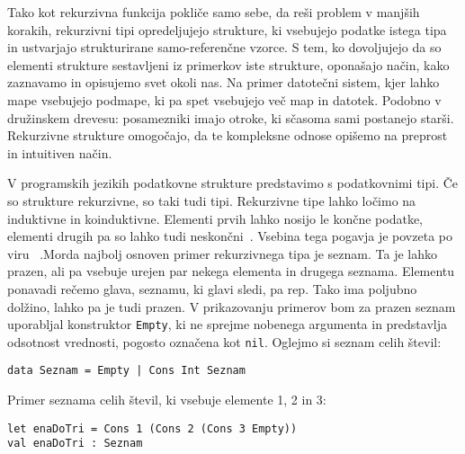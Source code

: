 \documentclass[12pt,a4paper,openany]{book}
\begin{document}
Tako kot rekurzivna funkcija pokliče samo sebe, da reši problem v manjših korakih, rekurzivni tipi opredeljujejo strukture, ki vsebujejo podatke istega tipa in ustvarjajo strukturirane 
samo-referenčne vzorce. S tem, ko dovoljujejo da so elementi strukture sestavljeni iz primerkov iste strukture, oponašajo način, kako zaznavamo in opisujemo svet okoli nas. 
Na primer datotečni sistem, kjer lahko mape vsebujejo podmape, ki pa spet vsebujejo več map in datotek. Podobno v družinskem drevesu: posamezniki imajo otroke, ki sčasoma sami 
postanejo starši. Rekurzivne strukture omogočajo, da te kompleksne odnose opišemo na preprost in intuitiven način.

V programskih jezikih podatkovne strukture predstavimo s podatkovnimi tipi. Če so strukture rekurzivne, so taki tudi tipi. Rekurzivne tipe lahko ločimo na induktivne in koinduktivne. Elementi prvih lahko nosijo le končne podatke, elementi drugih pa so lahko tudi neskončni~\cite{Sla15}. 
Vsebina tega pogavja je povzeta po viru ~\cite{Pie02}.Morda najbolj osnoven primer rekurzivnega tipa je seznam. Ta je lahko prazen, ali pa vsebuje urejen par nekega elementa in drugega seznama. Elementu ponavadi rečemo glava, seznamu, 
ki glavi sledi, pa rep. Tako ima poljubno dolžino, lahko pa je tudi prazen. V prikazovanju primerov bom za prazen seznam uporabljal konstruktor \lstinline{Empty}, ki ne sprejme nobenega argumenta in predstavlja odsotnost vrednosti, pogosto označena kot \lstinline{nil}. 
Oglejmo si seznam celih števil:
\begin{lstlisting}
data Seznam = Empty | Cons Int Seznam
\end{lstlisting}
Primer seznama celih števil, ki vsebuje elemente 1, 2 in 3:
\begin{lstlisting}
let enaDoTri = Cons 1 (Cons 2 (Cons 3 Empty))
val enaDoTri : Seznam
\end{lstlisting}
\end{document}
